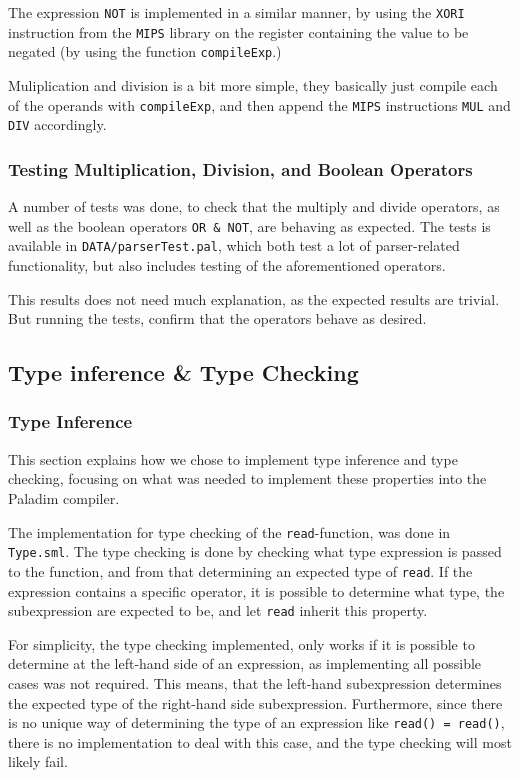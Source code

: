 \documentclass[10pt]{article}
\begin{document}
The expression \texttt{NOT} is implemented in a similar manner, by using the \texttt{XORI} instruction from the \texttt{MIPS} library on the register containing the value to be negated (by using the function \texttt{compileExp}.)

Muliplication and division is a bit more simple, they basically just compile each of the operands with \texttt{compileExp}, and then append the \texttt{MIPS} instructions \texttt{MUL} and \texttt{DIV} accordingly.

\subsubsection{Testing Multiplication, Division, and Boolean Operators}
A number of tests was done, to check that the multiply and divide operators, as well as the boolean operators \texttt{OR \& NOT}, are behaving as expected. The tests is available in \texttt{DATA/parserTest.pal}, which both test a lot of parser-related functionality, but also includes testing of the aforementioned operators.

This results does not need much explanation, as the expected results are trivial. But running the tests, confirm that the operators behave as desired.

\subsection{Type inference \& Type Checking}
\subsubsection{Type Inference}
This section explains how we chose to implement type inference and type checking, focusing on what was needed to implement these properties into the Paladim compiler.

The implementation for type checking of the \texttt{read}-function, was done in \texttt{Type.sml}. The type checking is done by checking what type expression is passed to the function, and from that determining an expected type of \texttt{read}. If the expression contains a specific operator, it is possible to determine what type, the subexpression are expected to be, and let \texttt{read} inherit this property.

For simplicity, the type checking implemented, only works if it is possible to determine at the left-hand side of an expression, as implementing all possible cases was not required. This means, that the left-hand subexpression determines the expected type of the right-hand side subexpression. Furthermore, since there is no unique way of determining the type of an expression like \texttt{read() = read()}, there is no implementation to deal with this case, and the type checking will most likely fail.
\end{document}
